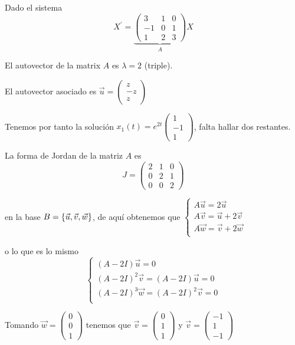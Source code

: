 \begin{example}
Dado el sistema $$X^\prime = \underbrace{\begin{pmatrix}
3 & 1 & 0\\-1 & 0 & 1\\1 & 2 & 3
\end{pmatrix}}_AX$$

El autovector de la matrix $A$ es $\lambda = 2$ (triple). 

El autovector asociado es $\vec{u} = \begin{pmatrix}
z\\-z\\z
\end{pmatrix}$

Tenemos por tanto la solución $x_1(t) = e^{2t}\begin{pmatrix}
1\\ -1\\ 1
\end{pmatrix}$, falta hallar dos restantes.

La forma de Jordan de la matriz $A$ es $$J = \begin{pmatrix}
2& 1& 0\\ 0& 2& 1\\ 0& 0& 2
\end{pmatrix}$$

en la base $B = \{ \vec{u}, \vec{v}, \vec{w} \}$, de aquí obtenemos que $\left\lbrace
  \begin{array}{l}
     A\vec{u} = 2\vec{u}\\
     A\vec{v} = \vec{u} + 2\vec{v}\\
     A\vec{w} = \vec{v} + 2\vec{w}\\
  \end{array}
  \right.
$ 

o lo que es lo mismo $$\left\lbrace
  \begin{array}{l}
     (A-2I)\vec{u} = 0\\
     (A-2I)^2\vec{v} = (A-2I)\vec{u} = 0\\
     (A-2I)^3\vec{w} = (A-2I)^2\vec{v} = 0\\
  \end{array}
  \right.$$
  
Tomando $\vec{w} = \begin{pmatrix}
0\\0\\1
\end{pmatrix}$ tenemos que $\vec{v} = \begin{pmatrix}
0\\1\\1
\end{pmatrix}$ y $\vec{v} = \begin{pmatrix}
-1\\1\\-1
\end{pmatrix}$


\end{example}
